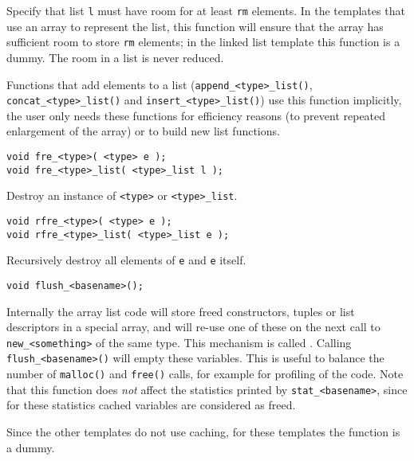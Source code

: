 \begin{desc}
Specify that list {\tt l} must have room for at least {\tt rm} elements.
In the templates that use an array to represent the list,
this function will ensure that the array has sufficient room to
store {\tt rm} elements;
in the linked list template this function is a dummy.
The room in a list is never reduced.
\par
Functions that add elements to a list (\verb+append_<type>_list()+,
\verb+concat_<type>_list()+ and
\verb+insert_<type>_list()+) use this function implicitly, the
user only needs these functions for efficiency reasons
(to prevent repeated enlargement of the array)
or to build new list functions.
\end{desc}
\begin{verbatim}
void fre_<type>( <type> e );
void fre_<type>_list( <type>_list l );
\end{verbatim}
\begin{desc}
Destroy an instance of {\tt <type>} or {\tt <type>\_list}.
\end{desc}
\begin{verbatim}
void rfre_<type>( <type> e );
void rfre_<type>_list( <type>_list e );
\end{verbatim}
\begin{desc}
Recursively destroy all elements of {\tt e} and {\tt e} itself.
\end{desc}
\begin{verbatim}
void flush_<basename>();
\end{verbatim}
\begin{desc}
\sloppy
Internally the array list code will store freed constructors,
tuples or list descriptors in a special array,
and will re-use one of these on the next call to {\tt new\_<something>}
of the same type.
This mechanism is called .
Calling {\tt flush\_<basename>()} will empty these variables.
This is useful to balance the number of {\tt malloc()} and {\tt free()}
calls, for example for profiling of the code.
Note that this function does {\em not} \/affect the statistics printed by
{\tt stat\_<basename>}, since for these statistics cached variables are
considered as freed.
\par
Since the other templates do not use caching,
for these templates the function is a dummy.
\end{desc}
